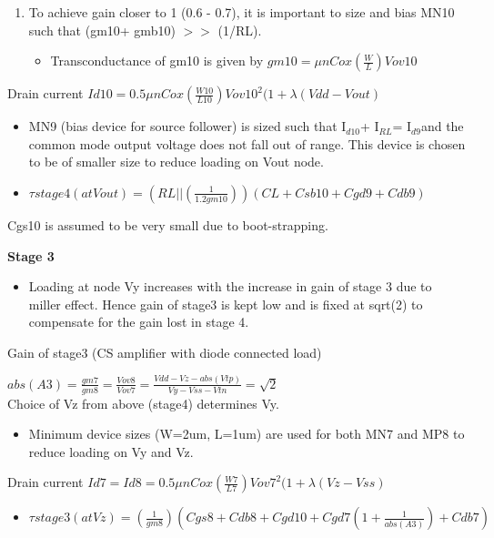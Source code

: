 \documentclass[12pt,a4paper]{article}
\begin{document}
\begin{enumerate}
\item To achieve gain closer to 1 (0.6 - 0.7), it is important to size 
and bias MN10 such that (gm10+ gmb10) $>$$>$ (1/RL). 
\begin{itemize}
\item Transconductance of gm10 is given by $gm10= \mu 
nCox(\frac{W}{L})Vov10$
\end{itemize}
\end{enumerate}
Drain current $Id10=0.5\mu nCox(\frac{W10}{L10})Vov10^{2} (1+\lambda 
(Vdd-Vout)$

\begin{itemize}
\item MN9 (bias device for source follower) is sized such that I$_{d10 
}$+ I$_{RL }$= I$_{d9 }$and the common mode output voltage does 
not fall out of range. This device is chosen to be of smaller size to 
reduce loading on Vout node. 
\item $\tau stage4 (at Vout)=(RL || 
(\frac{1}{1.2gm10}))(CL+Csb10+Cgd9+Cdb9)$
\end{itemize}
Cgs10 is assumed to be very small due to boot-strapping.



\textbf{Stage 3}



\begin{itemize}
\item Loading at node Vy increases with the increase in gain of stage 3 
due to miller effect. Hence gain of stage3 is kept low and is fixed at 
sqrt(2) to compensate for the gain lost in stage 4. 
\end{itemize}
Gain of stage3 (CS amplifier with diode connected load)



$
abs(A3)=\frac{gm7}{gm8}=\frac{Vov8}{Vov7}=\frac{Vdd-Vz-abs(Vtp)}{Vy-Vss-Vtn}= 
\sqrt{2}$\\


 

Choice of Vz from above (stage4) determines Vy.

\begin{itemize}
\item Minimum device sizes (W=2um, L=1um) are used for both MN7 and MP8 
to reduce loading on Vy and Vz.
\end{itemize}
Drain current $Id7=Id8=0.5\mu nCox(\frac{W7}{L7})Vov7^{2} (1+\lambda 
(Vz-Vss)$

\begin{itemize}
\item $\tau stage3 (at Vz)=(\frac{1}{gm8})(Cgs8+Cdb8+Cgd10+Cgd7 
(1+\frac{1}{abs(A3)})+Cdb7)$
\end{itemize}
\end{document}

